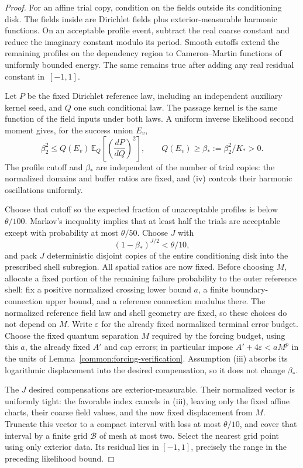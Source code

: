 \begin{proof}
For an affine trial copy, condition on the fields outside its
conditioning disk.  The fields inside are Dirichlet fields
plus exterior-measurable harmonic functions.  On an acceptable
profile event, subtract the real coarse constant and reduce
the imaginary constant modulo its period.  Smooth cutoffs
extend the remaining profiles on the dependency region to
Cameron--Martin functions of uniformly bounded energy.
The same remains true after adding any real residual constant
in~$[-1,1]$.

Let $P$ be the fixed Dirichlet reference law, including an
independent auxiliary kernel seed, and $Q$ one such
conditional law.  The passage kernel is the same function of
the field inputs under both laws.  A uniform inverse
likelihood second moment gives, for the success union $E_v$,
\[
 \beta_2^2
 \le Q(E_v)\,\mathbb E_Q\left[
           \left(\frac{dP}{dQ}\right)^2\right],
 \qquad Q(E_v)\ge\beta_*:=\beta_2^2/K_*>0.
\]
The profile cutoff and $\beta_*$ are independent of the number
of trial copies: the normalized domains and buffer ratios are
fixed, and (iv) controls their harmonic oscillations uniformly.

Choose that cutoff so the expected fraction of unacceptable
profiles is below $\theta/100$.  Markov's inequality implies
that at least half the trials are acceptable except with
probability at most $\theta/50$.  Choose $J$ with
\[
 (1-\beta_*)^{J/2}<\theta/10,
\]
and pack $J$ deterministic disjoint copies of the entire
conditioning disk into the prescribed shell subregion.
All spatial ratios are now fixed.  Before choosing $M$, allocate a
fixed portion of the remaining failure probability to the outer
reference shell: fix a positive normalized crossing lower bound
$a$, a finite boundary-connection upper bound, and a reference
connection modulus there.  The normalized reference field law and
shell geometry are fixed, so these choices do not depend on $M$.
Write $\varepsilon$ for the already fixed normalized terminal error
budget.  Choose the fixed quantum separation $M$ required by the forcing
budget, using this $a$, the already fixed $A'$ and cap errors;
in particular impose $A'+4\varepsilon<aM^p$ in the units of
Lemma~\ref{common:forcing-verification}.  Assumption (iii) absorbs
its logarithmic displacement into the desired compensation,
so it does not change $\beta_*$.

The $J$ desired compensations are exterior-measurable.  Their
normalized vector is uniformly tight: the favorable index
cancels in (iii), leaving only the fixed affine charts, their
coarse field values, and the now fixed displacement from $M$.
Truncate this vector to a compact interval with loss at most
$\theta/10$, and cover that interval by a finite grid
$\mathcal B$ of mesh at most two.  Select the nearest grid
point using only exterior data.  Its residual lies in
$[-1,1]$, precisely the range in the preceding likelihood
bound.


\end{proof}
